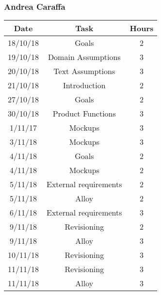 \clearpage
\newpage

\subsubsection{Andrea Caraffa}
\begin{table}[h]
\centering
\begin{tabular}{|c|c|c|}
\hline
\rowcolor[HTML]{FE996B} 
Date & Task & Hours 
\\ \hline
\rowcolor[HTML]{FFFC9E} 
18/10/18  & Goals & 2
\\ \hline
\rowcolor[HTML]{FFFC9E} 
19/10/18 & Domain Assumptions & 3 
\\ \hline
\rowcolor[HTML]{FFFC9E}
20/10/18 & Text Assumptions & 3
\\ \hline
\rowcolor[HTML]{FFFC9E}
21/10/18 & Introduction & 2
\\ \hline
\rowcolor[HTML]{FFFC9E}
27/10/18 & Goals & 2
\\ \hline
\rowcolor[HTML]{FFFC9E}
30/10/18 & Product Functions & 3
\\ \hline
\rowcolor[HTML]{FFFC9E}
1/11/17 & Mockups & 3
\\ \hline
\rowcolor[HTML]{FFFC9E}
3/11/18 & Mockups & 3
\\ \hline
\rowcolor[HTML]{FFFC9E}
4/11/18 & Goals & 2
\\ \hline
\rowcolor[HTML]{FFFC9E}
4/11/18 & Mockups & 2
\\ \hline
\rowcolor[HTML]{FFFC9E}
5/11/18 & External requirements & 2
\\ \hline
\rowcolor[HTML]{FFFC9E}
5/11/18 & Alloy & 2
\\ \hline
\rowcolor[HTML]{FFFC9E}
6/11/18 & External requirements & 3
\\ \hline
\rowcolor[HTML]{FFFC9E}
9/11/18 & Revisioning  & 2
\\ \hline
\rowcolor[HTML]{FFFC9E}
9/11/18 & Alloy  & 3
\\ \hline
\rowcolor[HTML]{FFFC9E}
10/11/18 & Revisioning & 3
\\ \hline
\rowcolor[HTML]{FFFC9E}
11/11/18 & Revisioning & 3
\\ \hline
\rowcolor[HTML]{FFFC9E}
11/11/18 & Alloy & 3
\\ \hline



\end{tabular}
\end{table}
